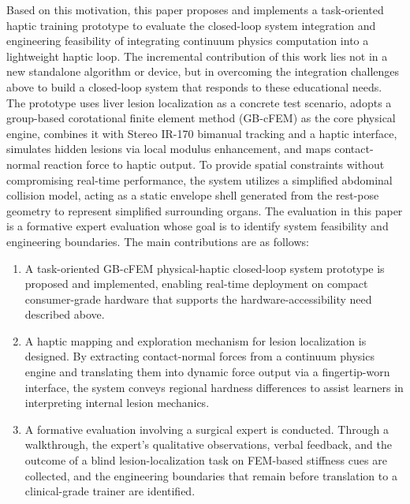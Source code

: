 \documentclass{ieeeaccess}
\begin{document}
Based on this motivation, this paper proposes and implements a task-oriented haptic training prototype to evaluate the closed-loop system integration and engineering feasibility of integrating continuum physics computation into a lightweight haptic loop. The incremental contribution of this work lies not in a new standalone algorithm or device, but in overcoming the integration challenges above to build a closed-loop system that responds to these educational needs. The prototype uses liver lesion localization as a concrete test scenario, adopts a group-based corotational finite element method (GB-cFEM) as the core physical engine, combines it with Stereo IR-170 bimanual tracking and a haptic interface, simulates hidden lesions via local modulus enhancement, and maps contact-normal reaction force to haptic output. To provide spatial constraints without compromising real-time performance, the system utilizes a simplified abdominal collision model, acting as a static envelope shell generated from the rest-pose geometry to represent simplified surrounding organs. The evaluation in this paper is a formative expert evaluation whose goal is to identify system feasibility and engineering boundaries. The main contributions are as follows:
\begin{enumerate}
\item A task-oriented GB-cFEM physical-haptic closed-loop system prototype is proposed and implemented, enabling real-time deployment on compact consumer-grade hardware that supports the hardware-accessibility need described above.
\item A haptic mapping and exploration mechanism for lesion localization is designed. By extracting contact-normal forces from a continuum physics engine and translating them into dynamic force output via a fingertip-worn interface, the system conveys regional hardness differences to assist learners in interpreting internal lesion mechanics.
\item A formative evaluation involving a surgical expert is conducted. Through a walkthrough, the expert's qualitative observations, verbal feedback, and the outcome of a blind lesion-localization task on FEM-based stiffness cues are collected, and the engineering boundaries that remain before translation to a clinical-grade trainer are identified.
\end{enumerate}
\end{document}
